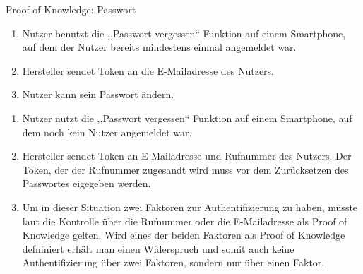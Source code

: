 \begin{itemize}[leftmargin=0cm,label={}]
                Proof of Knowledge: Passwort
                \begin{enumerate}[noitemsep]
                    \item Nutzer benutzt die ,,Passwort vergessen`` Funktion auf einem Smartphone, auf dem der Nutzer bereits mindestens einmal angemeldet war.
                    \item Hersteller sendet Token an die E-Mailadresse des Nutzers.
                    \item Nutzer kann sein Passwort ändern.
                \end{enumerate}
                \begin{enumerate}[noitemsep]
                    \item Nutzer nutzt die ,,Passwort vergessen`` Funktion auf einem Smartphone, auf dem noch kein Nutzer angemeldet war.
                    \item Hersteller sendet Token an E-Mailadresse und Rufnummer des Nutzers.
                        Der Token, der der Rufnummer zugesandt wird muss vor dem Zurücksetzen des Passwortes eigegeben werden.
                    \item Um in dieser Situation zwei Faktoren zur Authentifizierung zu haben, müsste laut \cite{Jmaxxz2015} die Kontrolle über die Rufnummer oder die E-Mailadresse als Proof of Knowledge gelten.
                        Wird eines der beiden Faktoren als Proof of Knowledge defniniert erhält man einen Widerspruch und somit auch keine Authentifizierung über zwei Faktoren, sondern nur über einen Faktor.
                \end{enumerate}
        \end{itemize}
        
